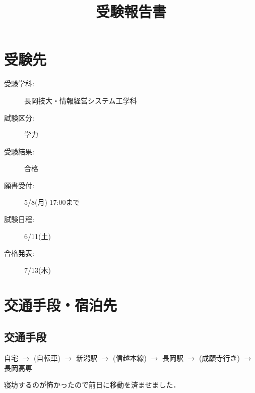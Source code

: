 \documentclass[dvipdfmx]{jsarticle}
\begin{document}
\title{受験報告書}
\author{} %
\date{}   %
\maketitle
\section{受験先}
\begin{description}
  \item[受験学科:] 長岡技大・情報経営システム工学科
  \item[試験区分:] 学力
  \item[受験結果:] 合格
  \item[願書受付:] 5/8(月) 17:00まで
  \item[試験日程:] 6/11(土)
  \item[合格発表:] 7/13(木)
\end{description}

\section{交通手段・宿泊先}

\subsection{交通手段}
自宅 $\rightarrow$ (自転車) $\rightarrow$ 新潟駅 $\rightarrow$ (信越本線)
$\rightarrow$ 長岡駅 $\rightarrow$ (成願寺行き) $\rightarrow$ 長岡高専

寝坊するのが怖かったので前日に移動を済ませました．
\end{document}
